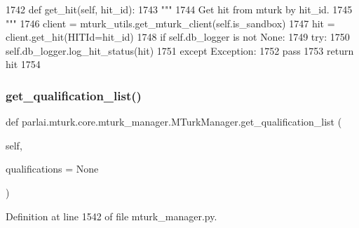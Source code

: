 \begin{DoxyCode}
1742     \textcolor{keyword}{def }get\_hit(self, hit\_id):
1743         \textcolor{stringliteral}{"""}
1744 \textcolor{stringliteral}{        Get hit from mturk by hit\_id.}
1745 \textcolor{stringliteral}{        """}
1746         client = mturk\_utils.get\_mturk\_client(self.is\_sandbox)
1747         hit = client.get\_hit(HITId=hit\_id)
1748         \textcolor{keywordflow}{if} self.db\_logger \textcolor{keywordflow}{is} \textcolor{keywordflow}{not} \textcolor{keywordtype}{None}:
1749             \textcolor{keywordflow}{try}:
1750                 self.db\_logger.log\_hit\_status(hit)
1751             \textcolor{keywordflow}{except} Exception:
1752                 \textcolor{keywordflow}{pass}
1753         \textcolor{keywordflow}{return} hit
1754 
\end{DoxyCode}
\mbox{\label{classparlai_1_1mturk_1_1core_1_1mturk__manager_1_1MTurkManager_a3466e2c936edfc55727d1bd3ac71cfb6}} 
\subsubsection{\texorpdfstring{get\+\_\+qualification\+\_\+list()}{get\_qualification\_list()}}
{\footnotesize\ttfamily def parlai.\+mturk.\+core.\+mturk\+\_\+manager.\+M\+Turk\+Manager.\+get\+\_\+qualification\+\_\+list (\begin{DoxyParamCaption}\item[{}]{self,  }\item[{}]{qualifications = {\ttfamily None} }\end{DoxyParamCaption})}



Definition at line 1542 of file mturk\+\_\+manager.\+py.


